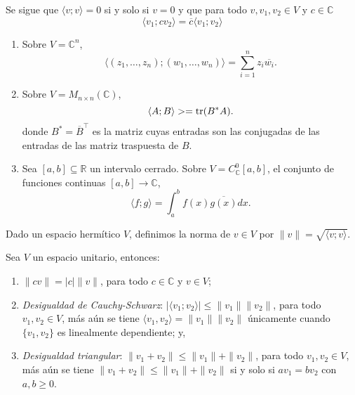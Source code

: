 \begin{obs}
Se sigue que $\langle v;v \rangle=0$ si y solo si $v=0$ y que para todo $v,v_1,v_2\in V$ y $c\in\mathbb{C}$
\[
\langle v_1;cv_2\rangle  =  \overline{c}\langle v_1;v_2\rangle
\]
\end{obs}

\begin{ejem}
\begin{enumerate}
\item Sobre $V=\mathbb{C}^n$,
\[
\langle (z_1,\ldots,z_n);(w_1,\ldots,w_n)\rangle =\sum_{i=1}^n z_i\overline{w_i}.
\]
\item Sobre $V=M_{n\times n}(\mathbb{C})$,
\[
\langle A; B\rangle>=\operatorname{tr}(B^* A).
\]
donde $B^*=\overline{B}^\intercal$ es la matriz cuyas entradas son las conjugadas de las entradas de las matriz traspuesta de $B$.
\item Sea $[a,b]\subseteq\mathbb{R}$ un intervalo cerrado. Sobre $V=C^0_{\mathbb{C}}[a,b]$, el conjunto de funciones continuas $[a,b]\rightarrow\mathbb{C}$,
\[
\langle f;g \rangle=\int_a^bf(x)\overline{g(x)}dx.
\]
\end{enumerate}
\end{ejem}

\begin{defn}
Dado un espacio herm\'itico $V$, definimos la norma de $v\in V$ por $\|v\|=\sqrt{\langle v;v\rangle}$.
\end{defn}

\begin{pro}
Sea $V$ un espacio unitario, entonces:
\begin{enumerate}
\item $\|cv\|=|c|\|v\|$, para todo $c\in\mathbb{C}$ y $v\in V$;
\item \emph{Desigualdad de Cauchy-Schwarz}: $|\langle v_1;v_2\rangle|\le\|v_1\|\|v_2\|$, para todo $v_1,v_2\in V$, m\'as a\'un se tiene $\langle v_1,v_2\rangle=\|v_1\|\|v_2\|$ \'unicamente cuando $\{v_1,v_2\}$ es linealmente dependiente; y,
\item \emph{Desigualdad triangular}: $\|v_1+v_2\|\le \|v_1\|+\|v_2\|$, para todo $v_1,v_2\in V$, m\'as a\'un se tiene $\|v_1+v_2\|\le \|v_1\|+\|v_2\|$ si y solo si $av_1=bv_2$ con $a,b\ge 0$.
\end{enumerate}
\end{pro}

